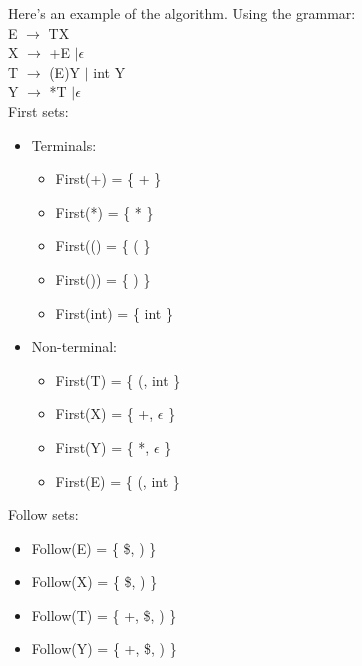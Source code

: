 \documentclass[12pt]{article}
\begin{document}
\vspace{3mm}
Here's an example of the algorithm. Using the grammar: 
\\ E $\rightarrow$ TX
\\ X $\rightarrow$ +E $| \epsilon$
\\ T $\rightarrow$ (E)Y $|$ int Y
\\ Y $\rightarrow$ *T $| \epsilon$
\\ First sets: 
\begin{itemize}
    \item Terminals: 
        \begin{itemize}
            \item First(+) = \{ + \} 
            \item First(*) = \{ * \}
            \item First(() = \{ ( \}
            \item First()) = \{ ) \} 
            \item First(int) = \{ int \}
        \end{itemize}
    \item Non-terminal: 
        \begin{itemize}
            \item First(T) = \{ (, int \} 
            \item First(X) = \{ +, $\epsilon$ \} 
            \item First(Y) = \{ *, $\epsilon$ \} 
            \item First(E) = \{ (, int \} 
        \end{itemize}
\end{itemize}
Follow sets:
\begin{itemize}
    \item Follow(E) = \{ \$, ) \} 
    \item Follow(X) = \{ \$, ) \} 
    \item Follow(T) = \{ +, \$, ) \} 
    \item Follow(Y) = \{ +, \$, ) \} 
\end{itemize}
\end{document}
